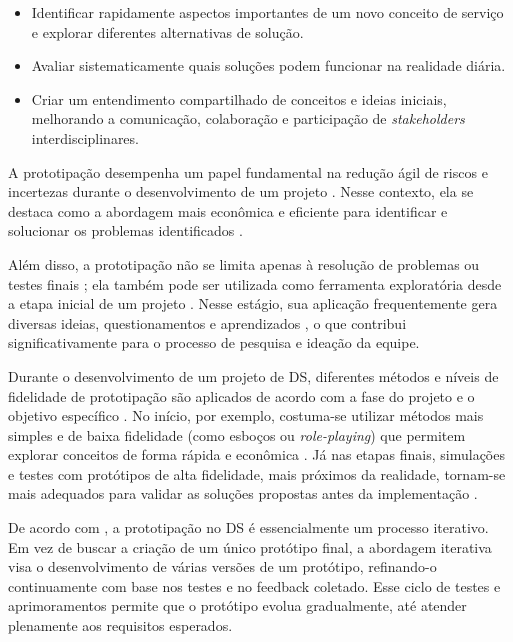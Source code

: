 \begin{itemize}
	\item Identificar rapidamente aspectos importantes de um novo conceito de serviço e explorar diferentes alternativas de solução.
	\item Avaliar sistematicamente quais soluções podem funcionar na realidade diária.
	\item Criar um entendimento compartilhado de conceitos e ideias iniciais, melhorando a comunicação, colaboração e participação de \textit{stakeholders} interdisciplinares.
\end{itemize}

A prototipação desempenha um papel fundamental na redução ágil de riscos e incertezas durante o desenvolvimento de um projeto \cite{mager2023product}. Nesse contexto, ela se destaca como a abordagem mais econômica e eficiente para identificar e solucionar os problemas identificados \cite{soto2023prototyping}.

Além disso, a prototipação não se limita apenas à resolução de problemas ou testes finais \cite{paust2025integrative}; ela também pode ser utilizada como ferramenta exploratória desde a etapa inicial de um projeto \cite{soto2023prototyping, lee2022how}. Nesse estágio, sua aplicação frequentemente gera diversas ideias, questionamentos e aprendizados \cite{paust2025integrative}, o que contribui significativamente para o processo de pesquisa e ideação da equipe.

Durante o desenvolvimento de um projeto de DS, diferentes métodos e níveis de fidelidade de prototipação são aplicados de acordo com a fase do projeto e o objetivo específico \cite{mager2023product, paust2025integrative, wang2023smartproducts}. No início, por exemplo, costuma-se utilizar métodos mais simples e de baixa fidelidade (como esboços ou \textit{role-playing}) que permitem explorar conceitos de forma rápida e econômica \cite{asbjornsen2022echange, kumar2023rheumatology, seko2024transitions}. Já nas etapas finais, simulações e testes com protótipos de alta fidelidade, mais próximos da realidade, tornam-se mais adequados para validar as soluções propostas antes da implementação \cite{asbjornsen2022echange, villa2022integratedcare, seko2024transitions, yan2022pssvalue}.

De acordo com \cite{Christie2012}, a prototipação no DS é essencialmente um processo iterativo. Em vez de buscar a criação de um único protótipo final, a abordagem iterativa visa o desenvolvimento de várias versões de um protótipo, refinando-o continuamente com base nos testes e no feedback coletado. Esse ciclo de testes e aprimoramentos permite que o protótipo evolua gradualmente, até atender plenamente aos requisitos esperados.

